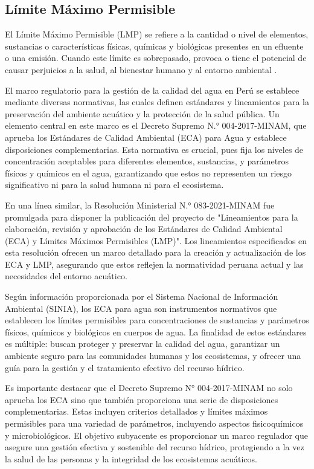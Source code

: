 \subsection{Límite Máximo Permisible}

El Límite Máximo Permisible (LMP) se refiere a la cantidad o nivel de elementos, sustancias o características físicas, químicas y biológicas presentes en un efluente o una emisión. Cuando este límite es sobrepasado, provoca o tiene el potencial de causar perjuicios a la salud, al bienestar humano y al entorno ambiental \cite{minam2005}.


El marco regulatorio para la gestión de la calidad del agua en Perú se establece mediante diversas normativas, las cuales definen estándares y lineamientos para la preservación del ambiente acuático y la protección de la salud pública. Un elemento central en este marco es el Decreto Supremo N.° 004-2017-MINAM\cite{DS0042017MINAM}, que aprueba los Estándares de Calidad Ambiental (ECA) para Agua y establece disposiciones complementarias. Esta normativa es crucial, pues fija los niveles de concentración aceptables para diferentes elementos, sustancias, y parámetros físicos y químicos en el agua, garantizando que estos no representen un riesgo significativo ni para la salud humana ni para el ecosistema.

En una línea similar, la Resolución Ministerial N.° 083-2021-MINAM\cite{RM0832021MINAM} fue promulgada para disponer la publicación del proyecto de "Lineamientos para la elaboración, revisión y aprobación de los Estándares de Calidad Ambiental (ECA) y Límites Máximos Permisibles (LMP)". Los lineamientos especificados en esta resolución ofrecen un marco detallado para la creación y actualización de los ECA y LMP, asegurando que estos reflejen la normatividad peruana actual y las necesidades del entorno acuático.

Según información proporcionada por el Sistema Nacional de Información Ambiental (SINIA)\cite{SINIA}, los ECA para agua son instrumentos normativos que establecen los límites permisibles para concentraciones de sustancias y parámetros físicos, químicos y biológicos en cuerpos de agua. La finalidad de estos estándares es múltiple: buscan proteger y preservar la calidad del agua, garantizar un ambiente seguro para las comunidades humanas y los ecosistemas, y ofrecer una guía para la gestión y el tratamiento efectivo del recurso hídrico.

Es importante destacar que el Decreto Supremo N° 004-2017-MINAM\cite{DS0042017MINAM} no solo aprueba los ECA sino que también proporciona una serie de disposiciones complementarias. Estas incluyen criterios detallados y límites máximos permisibles para una variedad de parámetros, incluyendo aspectos fisicoquímicos y microbiológicos. El objetivo subyacente es proporcionar un marco regulador que asegure una gestión efectiva y sostenible del recurso hídrico, protegiendo a la vez la salud de las personas y la integridad de los ecosistemas acuáticos.

